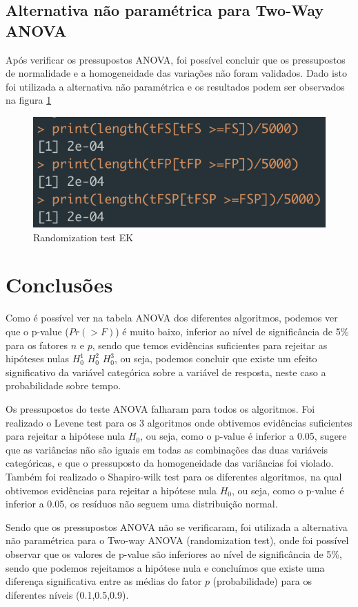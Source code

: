 \documentclass{uofa-eng-assignment}
\begin{document}
\subsection{Alternativa não paramétrica para Two-Way ANOVA}

Após verificar os pressupostos ANOVA, foi possível concluir que os pressupostos de normalidade e a homogeneidade das variações não foram validados. Dado isto foi utilizada a alternativa não paramétrica e os resultados podem ser observados na figura \ref{fig:randtest-ek}

\begin{figure}[h]
    \centering
    \includegraphics[width=0.5\linewidth]{rand_test_ek.png}
    \caption{Randomization test EK}
    \label{fig:randtest-ek}
\end{figure}

\section{Conclusões}

Como é possível ver na tabela ANOVA dos diferentes algoritmos, podemos ver que o p-value ($Pr(>F)$) é muito baixo, inferior ao nível de significância de 5\% para os fatores $n$ e $p$, sendo que temos evidências suficientes para rejeitar as hipóteses nulas $H_0^1$ $H_0^2$ $H_0^3$, ou seja, podemos concluir que existe um efeito significativo da variável categórica sobre a variável de resposta, neste caso a probabilidade sobre tempo.

Os pressupostos do teste ANOVA falharam para todos os algoritmos. Foi realizado o Levene test para os 3 algoritmos onde obtivemos evidências suficientes para rejeitar a hipótese nula $H_0$, ou seja, como o p-value é inferior a 0.05, sugere que as variâncias não são iguais em todas as combinações das duas variáveis categóricas, e que o pressuposto da homogeneidade das variâncias foi violado.
Também foi realizado o Shapiro-wilk test para os diferentes algoritmos, na qual obtivemos evidências para rejeitar a hipótese nula $H_0$, ou seja, como o p-value é inferior a 0.05, os resíduos não seguem uma distribuição normal.

Sendo que os pressupostos ANOVA não se verificaram, foi utilizada a alternativa não paramétrica para o Two-way ANOVA (randomization test), onde foi possível observar que os valores de p-value são inferiores ao nível de significância de 5\%, sendo que podemos rejeitamos a hipótese nula e concluímos que existe uma diferença significativa entre as médias do fator $p$ (probabilidade) para os diferentes níveis (0.1,0.5,0.9). 
\end{document}
